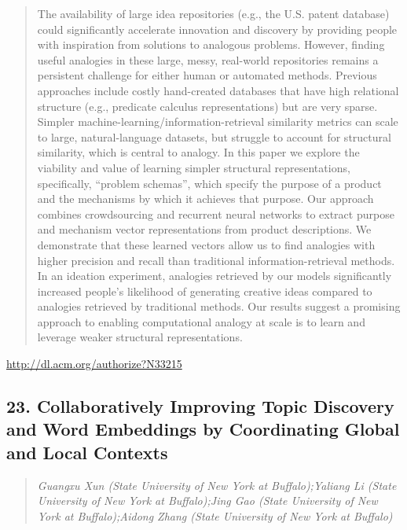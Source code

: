 \documentclass{article}
\begin{document}
\begin{quote}
The availability of large idea repositories (e.g., the U.S. patent database) could significantly accelerate innovation and discovery by providing people with inspiration from solutions to analogous problems. However, finding useful analogies in these large, messy, real-world repositories remains a persistent challenge for either human or automated methods. Previous approaches include costly hand-created databases that have high relational structure (e.g., predicate calculus representations) but are very sparse. Simpler machine-learning/information-retrieval similarity metrics can scale to large, natural-language datasets, but struggle to account for structural similarity, which is central to analogy. In this paper we explore the viability and value of learning simpler structural representations, specifically, “problem schemas”, which specify the purpose of a product and the mechanisms by which it achieves that purpose. Our approach combines crowdsourcing and recurrent neural networks to extract purpose and mechanism vector representations from product descriptions. We demonstrate that these learned vectors allow us to find analogies with higher precision and recall than traditional information-retrieval methods. In an ideation experiment, analogies retrieved by our models significantly increased people’s likelihood of generating creative ideas compared to analogies retrieved by traditional methods. Our results suggest a promising approach to enabling computational analogy at scale is to learn and leverage weaker structural representations.
\end{quote}

\href{http://dl.acm.org/authorize?N33215}{http://dl.acm.org/authorize?N33215}

\subsection{23. Collaboratively Improving Topic Discovery and Word Embeddings by Coordinating Global and Local Contexts}

\begin{quote}
\footnotesize{\textit{Guangxu Xun (State University of New York at Buffalo);Yaliang Li (State University of New York at Buffalo);Jing Gao (State University of New York at Buffalo);Aidong Zhang (State University of New York at Buffalo)}}

\end{quote}
\end{document}
